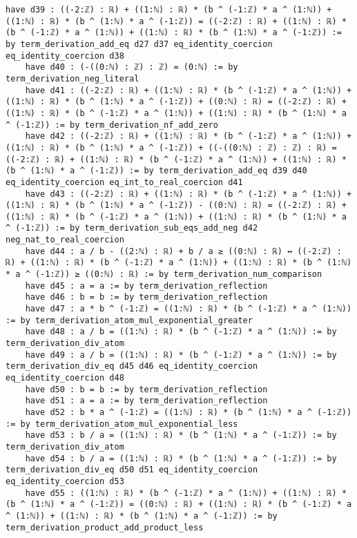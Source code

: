 \documentclass{article}
\begin{document}
\begin{tcolorbox}[colback=white!10, width=\linewidth]
\begin{lstlisting}[language=Lean4]
    have d39 : ((-2:ℤ) : ℝ) + ((1:ℕ) : ℝ) * (b ^ (-1:ℤ) * a ^ (1:ℕ)) + ((1:ℕ) : ℝ) * (b ^ (1:ℕ) * a ^ (-1:ℤ)) = ((-2:ℤ) : ℝ) + ((1:ℕ) : ℝ) * (b ^ (-1:ℤ) * a ^ (1:ℕ)) + ((1:ℕ) : ℝ) * (b ^ (1:ℕ) * a ^ (-1:ℤ)) := by term_derivation_add_eq d27 d37 eq_identity_coercion eq_identity_coercion d38
    have d40 : (-((0:ℕ) : ℤ) : ℤ) = (0:ℕ) := by term_derivation_neg_literal
    have d41 : ((-2:ℤ) : ℝ) + ((1:ℕ) : ℝ) * (b ^ (-1:ℤ) * a ^ (1:ℕ)) + ((1:ℕ) : ℝ) * (b ^ (1:ℕ) * a ^ (-1:ℤ)) + ((0:ℕ) : ℝ) = ((-2:ℤ) : ℝ) + ((1:ℕ) : ℝ) * (b ^ (-1:ℤ) * a ^ (1:ℕ)) + ((1:ℕ) : ℝ) * (b ^ (1:ℕ) * a ^ (-1:ℤ)) := by term_derivation_nf_add_zero
    have d42 : ((-2:ℤ) : ℝ) + ((1:ℕ) : ℝ) * (b ^ (-1:ℤ) * a ^ (1:ℕ)) + ((1:ℕ) : ℝ) * (b ^ (1:ℕ) * a ^ (-1:ℤ)) + ((-((0:ℕ) : ℤ) : ℤ) : ℝ) = ((-2:ℤ) : ℝ) + ((1:ℕ) : ℝ) * (b ^ (-1:ℤ) * a ^ (1:ℕ)) + ((1:ℕ) : ℝ) * (b ^ (1:ℕ) * a ^ (-1:ℤ)) := by term_derivation_add_eq d39 d40 eq_identity_coercion eq_int_to_real_coercion d41
    have d43 : ((-2:ℤ) : ℝ) + ((1:ℕ) : ℝ) * (b ^ (-1:ℤ) * a ^ (1:ℕ)) + ((1:ℕ) : ℝ) * (b ^ (1:ℕ) * a ^ (-1:ℤ)) - ((0:ℕ) : ℝ) = ((-2:ℤ) : ℝ) + ((1:ℕ) : ℝ) * (b ^ (-1:ℤ) * a ^ (1:ℕ)) + ((1:ℕ) : ℝ) * (b ^ (1:ℕ) * a ^ (-1:ℤ)) := by term_derivation_sub_eqs_add_neg d42 neg_nat_to_real_coercion
    have d44 : a / b - ((2:ℕ) : ℝ) + b / a ≥ ((0:ℕ) : ℝ) ↔ ((-2:ℤ) : ℝ) + ((1:ℕ) : ℝ) * (b ^ (-1:ℤ) * a ^ (1:ℕ)) + ((1:ℕ) : ℝ) * (b ^ (1:ℕ) * a ^ (-1:ℤ)) ≥ ((0:ℕ) : ℝ) := by term_derivation_num_comparison
    have d45 : a = a := by term_derivation_reflection
    have d46 : b = b := by term_derivation_reflection
    have d47 : a * b ^ (-1:ℤ) = ((1:ℕ) : ℝ) * (b ^ (-1:ℤ) * a ^ (1:ℕ)) := by term_derivation_atom_mul_exponential_greater
    have d48 : a / b = ((1:ℕ) : ℝ) * (b ^ (-1:ℤ) * a ^ (1:ℕ)) := by term_derivation_div_atom
    have d49 : a / b = ((1:ℕ) : ℝ) * (b ^ (-1:ℤ) * a ^ (1:ℕ)) := by term_derivation_div_eq d45 d46 eq_identity_coercion eq_identity_coercion d48
    have d50 : b = b := by term_derivation_reflection
    have d51 : a = a := by term_derivation_reflection
    have d52 : b * a ^ (-1:ℤ) = ((1:ℕ) : ℝ) * (b ^ (1:ℕ) * a ^ (-1:ℤ)) := by term_derivation_atom_mul_exponential_less
    have d53 : b / a = ((1:ℕ) : ℝ) * (b ^ (1:ℕ) * a ^ (-1:ℤ)) := by term_derivation_div_atom
    have d54 : b / a = ((1:ℕ) : ℝ) * (b ^ (1:ℕ) * a ^ (-1:ℤ)) := by term_derivation_div_eq d50 d51 eq_identity_coercion eq_identity_coercion d53
    have d55 : ((1:ℕ) : ℝ) * (b ^ (-1:ℤ) * a ^ (1:ℕ)) + ((1:ℕ) : ℝ) * (b ^ (1:ℕ) * a ^ (-1:ℤ)) = ((0:ℕ) : ℝ) + ((1:ℕ) : ℝ) * (b ^ (-1:ℤ) * a ^ (1:ℕ)) + ((1:ℕ) : ℝ) * (b ^ (1:ℕ) * a ^ (-1:ℤ)) := by term_derivation_product_add_product_less

\end{lstlisting}
\end{tcolorbox}
\end{document}
